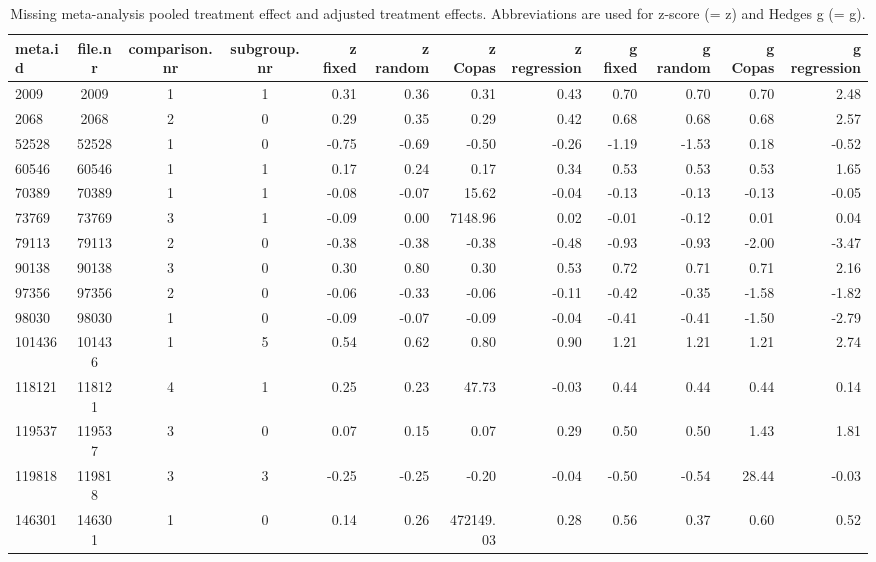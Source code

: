 \begin{table}[ht]
\centering
\begingroup\tiny
\begin{tabular}{lcccrrrrrrrr}
  \hline
meta.id & file.nr & comparison.nr & subgroup.nr & z fixed & z random & z Copas & z regression & g fixed & g random & g Copas & g regression \\ 
  \hline
2009 & 2009 & 1 & 1 & 0.31 & 0.36 & 0.31 & 0.43 & 0.70 & 0.70 & 0.70 & 2.48 \\ 
  2068 & 2068 & 2 & 0 & 0.29 & 0.35 & 0.29 & 0.42 & 0.68 & 0.68 & 0.68 & 2.57 \\ 
  52528 & 52528 & 1 & 0 & -0.75 & -0.69 & -0.50 & -0.26 & -1.19 & -1.53 & 0.18 & -0.52 \\ 
  60546 & 60546 & 1 & 1 & 0.17 & 0.24 & 0.17 & 0.34 & 0.53 & 0.53 & 0.53 & 1.65 \\ 
  70389 & 70389 & 1 & 1 & -0.08 & -0.07 & 15.62 & -0.04 & -0.13 & -0.13 & -0.13 & -0.05 \\ 
  73769 & 73769 & 3 & 1 & -0.09 & 0.00 & 7148.96 & 0.02 & -0.01 & -0.12 & 0.01 & 0.04 \\ 
  79113 & 79113 & 2 & 0 & -0.38 & -0.38 & -0.38 & -0.48 & -0.93 & -0.93 & -2.00 & -3.47 \\ 
  90138 & 90138 & 3 & 0 & 0.30 & 0.80 & 0.30 & 0.53 & 0.72 & 0.71 & 0.71 & 2.16 \\ 
  97356 & 97356 & 2 & 0 & -0.06 & -0.33 & -0.06 & -0.11 & -0.42 & -0.35 & -1.58 & -1.82 \\ 
  98030 & 98030 & 1 & 0 & -0.09 & -0.07 & -0.09 & -0.04 & -0.41 & -0.41 & -1.50 & -2.79 \\ 
  101436 & 101436 & 1 & 5 & 0.54 & 0.62 & 0.80 & 0.90 & 1.21 & 1.21 & 1.21 & 2.74 \\ 
  118121 & 118121 & 4 & 1 & 0.25 & 0.23 & 47.73 & -0.03 & 0.44 & 0.44 & 0.44 & 0.14 \\ 
  119537 & 119537 & 3 & 0 & 0.07 & 0.15 & 0.07 & 0.29 & 0.50 & 0.50 & 1.43 & 1.81 \\ 
  119818 & 119818 & 3 & 3 & -0.25 & -0.25 & -0.20 & -0.04 & -0.50 & -0.54 & 28.44 & -0.03 \\ 
  146301 & 146301 & 1 & 0 & 0.14 & 0.26 & 472149.03 & 0.28 & 0.56 & 0.37 & 0.60 & 0.52 \\ 
   \hline
\end{tabular}
\endgroup
\caption{Missing meta-analysis pooled treatment effect and adjusted treatment effects. Abbreviations are used for z-score (= z) and Hedges g (= g).} 
\label{missing.differences}
\end{table}




